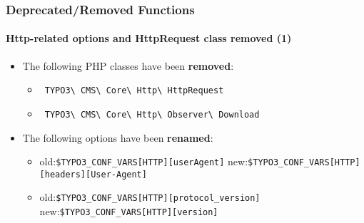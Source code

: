 \begin{frame}[fragile]
	\frametitle{Deprecated/Removed Functions}
	\framesubtitle{Http-related options and HttpRequest class removed (1)}

	\begin{itemize}

		\item The following PHP classes have been \textbf{removed}:

			\begin{itemize}
				\item \small\texttt{
					TYPO3\textbackslash
					CMS\textbackslash
					Core\textbackslash
					Http\textbackslash
					HttpRequest}\normalsize
				\item \small\texttt{
					TYPO3\textbackslash
					CMS\textbackslash
					Core\textbackslash
					Http\textbackslash
					Observer\textbackslash
					Download}\normalsize
			\end{itemize}

		\item The following options have been \textbf{renamed}:

			\begin{itemize}

				\item
					\small
						old:\tabto{1cm}\texttt{\$TYPO3\_CONF\_VARS[HTTP][userAgent]}\newline
						new:\tabto{1cm}\texttt{\$TYPO3\_CONF\_VARS[HTTP][headers][User-Agent]}

				\item
					\small
						old:\tabto{1cm}\texttt{\$TYPO3\_CONF\_VARS[HTTP][protocol\_version]}\newline
						new:\tabto{1cm}\texttt{\$TYPO3\_CONF\_VARS[HTTP][version]}

			\end{itemize}

	\end{itemize}

\end{frame}


